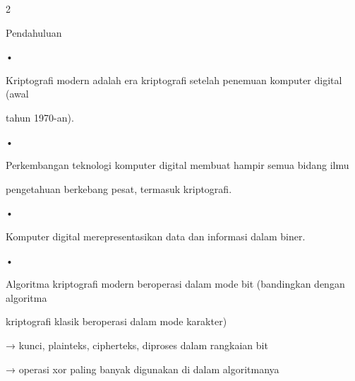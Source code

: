 \documentclass{article}
\begin{document}

2

Pendahuluan

•

Kriptografi modern adalah era kriptografi setelah penemuan komputer digital (awal 

tahun 1970-an).

•

Perkembangan teknologi komputer digital membuat hampir semua bidang ilmu 

pengetahuan berkebang pesat, termasuk kriptografi.

•

Komputer digital merepresentasikan data dan informasi dalam biner.

•

Algoritma kriptografi modern beroperasi dalam mode bit (bandingkan dengan algoritma 

kriptografi klasik beroperasi dalam mode karakter)


→ kunci, plainteks, cipherteks,  diproses dalam rangkaian bit


→ operasi xor paling banyak digunakan di dalam algoritmanya
\end{document}
